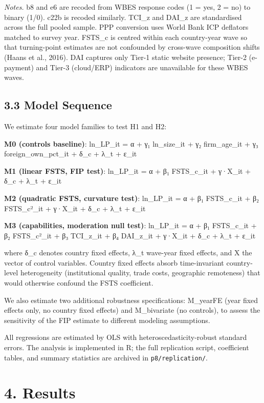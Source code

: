 \documentclass[
  12pt]{article}
\begin{document}
\emph{Notes.} b8 and e6 are recoded from WBES response codes (1 = yes, 2
= no) to binary (1/0). c22b is recoded similarly. TCI\_z and DAI\_z are
standardised across the full pooled sample. PPP conversion uses World
Bank ICP deflators matched to survey year. FSTS\_c is centred within
each country-year wave so that turning-point estimates are not
confounded by cross-wave composition shifts (Haans et al., 2016). DAI
captures only Tier-1 static website presence; Tier-2 (e-payment) and
Tier-3 (cloud/ERP) indicators are unavailable for these WBES waves.

\hypertarget{model-sequence}{%
\subsection{3.3 Model Sequence}\label{model-sequence}}

We estimate four model families to test H1 and H2:

\textbf{M0 (controls baseline)}: ln\_LP\_it = α + γ₁ ln\_size\_it + γ₂
firm\_age\_it + γ₃ foreign\_own\_pct\_it + δ\_c + λ\_t + ε\_it

\textbf{M1 (linear FSTS, FIP test)}: ln\_LP\_it = α + β₁ FSTS\_c\_it +
γ·X\_it + δ\_c + λ\_t + ε\_it

\textbf{M2 (quadratic FSTS, curvature test)}: ln\_LP\_it = α + β₁
FSTS\_c\_it + β₂ FSTS\_c²\_it + γ·X\_it + δ\_c + λ\_t + ε\_it

\textbf{M3 (capabilities, moderation null test)}: ln\_LP\_it = α + β₁
FSTS\_c\_it + β₂ FSTS\_c²\_it + β₃ TCI\_z\_it + β₄ DAI\_z\_it + γ·X\_it
+ δ\_c + λ\_t + ε\_it

where δ\_c denotes country fixed effects, λ\_t wave-year fixed effects,
and X the vector of control variables. Country fixed effects absorb
time-invariant country-level heterogeneity (institutional quality, trade
costs, geographic remoteness) that would otherwise confound the FSTS
coefficient.

We also estimate two additional robustness specifications: M\_yearFE
(year fixed effects only, no country fixed effects) and M\_bivariate (no
controls), to assess the sensitivity of the FIP estimate to different
modeling assumptions.

All regressions are estimated by OLS with heteroscedasticity-robust
standard errors. The analysis is implemented in R; the full replication
script, coefficient tables, and summary statistics are archived in
\texttt{p8/replication/}.

\hypertarget{results}{%
\section{4. Results}\label{results}}
\end{document}
